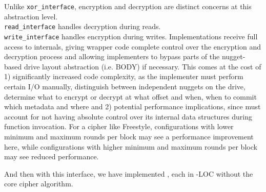 
 Unlike
\texttt{xor\_interface}, encryption and decryption are distinct concerns at this
abstraction level. \\\texttt{read\_interface} handles decryption during reads.
\\\texttt{write\_interface} handles encryption during writes. Implementations
receive full access to \sys internals, giving wrapper code complete control over
the encryption and decryption process and allowing implementers to bypass parts
of the nugget-based drive layout abstraction (i.e. BODY) if necessary. This
comes at the cost of 1) significantly increased code complexity, as the
implementer must perform certain I/O manually, distinguish between independent
nuggets on the drive, determine what to encrypt or decrypt at what offset and
when, when to commit which metadata and where and 2) potential performance
implications, since \sys must account for not having absolute control over its
internal data structures during function invocation. For a cipher like
Freestyle, configurations with lower minimum and maximum rounds per block may
see a performance improvement here, while configurations with higher minimum and
maximum rounds per block may see reduced performance.

And then with this interface, we have implemented , each in \xxx-\xxx LOC without the core cipher
algorithm.




